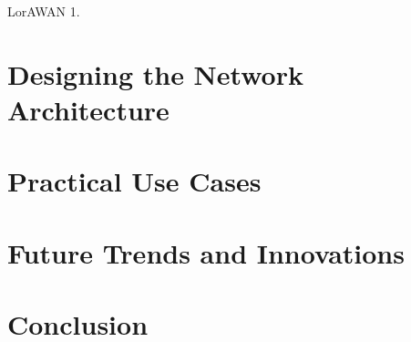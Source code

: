 \documentclass[article,a4paper]{IEEEtran}
\begin{document}
    LorAWAN
    1. 

    \section{Designing the Network Architecture}

    \section{Practical Use Cases}

    \section{Future Trends and Innovations}

    \section{Conclusion}

\printbibliography
\end{document}
